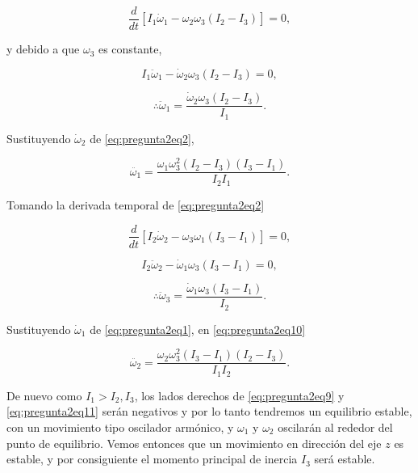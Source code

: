 \documentclass[a4paper,10pt]{article}
\numberwithin{equation}{section}
\begin{document}
\begin{equation}
 \frac{d}{dt}\left[I_1\dot{\omega}_1 - \omega_2\omega_3(I_2 - I_3) \right] = 0,
\end{equation}

y debido a que $\omega_3$ es constante, 

\begin{equation}
 I_1\ddot{\omega}_1 - \dot{\omega}_2\omega_3(I_2 - I_3) = 0,
\end{equation}

\begin{equation}
 \therefore \ddot{\omega}_1 = \frac{\dot{\omega}_2\omega_3(I_2-I_3)}{I_1}.
  \label{eq:pregunta2eq8}
\end{equation}

Sustituyendo $\dot{\omega}_2$ de \eqref{eq:pregunta2eq2}, 

\begin{equation}
 \ddot{\omega_1} = \frac{\omega_1\omega_3^2(I_2 - I_3)(I_3 - I_1)}{I_2I_1}.
 \label{eq:pregunta2eq9}
\end{equation}

Tomando la derivada temporal de \eqref{eq:pregunta2eq2} 

\begin{equation}
 \frac{d}{dt}\left[I_2\dot{\omega}_2 - \omega_3\omega_1(I_3 - I_1) \right] = 0,
\end{equation}

\begin{equation}
 I_2\ddot{\omega}_2 - \dot{\omega}_1\omega_3(I_3 - I_1) = 0,
\end{equation}

\begin{equation}
 \therefore \ddot{\omega}_3 = \frac{\dot{\omega}_1\omega_3(I_3-I_1)}{I_2}.
 \label{eq:pregunta2eq10}
\end{equation}

Sustituyendo $\dot{\omega}_1$ de \eqref{eq:pregunta2eq1}, en \eqref{eq:pregunta2eq10}

\begin{equation}
 \ddot{\omega_2} = \frac{\omega_2\omega_3^2(I_3 - I_1)(I_2- I_3)}{I_1I_2}.
 \label{eq:pregunta2eq11}
\end{equation}

De nuevo como $I_1 > I_2,I_3$, los lados derechos de \eqref{eq:pregunta2eq9} y 
\eqref{eq:pregunta2eq11} serán negativos y por lo tanto tendremos un equilibrio 
estable, con un movimiento tipo oscilador armónico, y $\omega_1$ y $\omega_2$ 
oscilarán al rededor del punto de equilibrio. Vemos entonces que un movimiento 
en dirección del eje $z$ es estable, y por consiguiente el momento principal 
de inercia $I_3$ será estable. 
\end{document}
